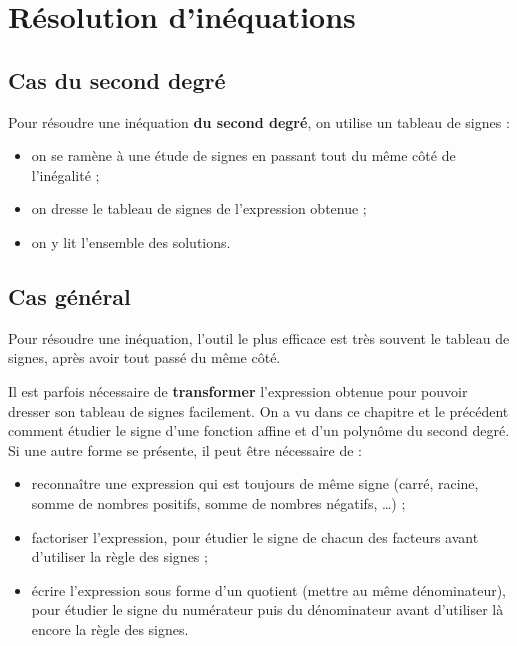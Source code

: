 \documentclass[a4paper,11pt]{article}
\begin{document}
\section{Résolution d'inéquations}

\subsection{Cas du second degré}

\begin{cmethode}
Pour résoudre une inéquation \textbf{du second degré}, on utilise un tableau de signes :
\begin{itemize}
	\item on se ramène à une étude de signes en passant tout du même côté de l'inégalité ;
	\item on dresse le tableau de signes de l'expression obtenue ;
	\item on y lit l'ensemble des solutions.
\end{itemize}
\end{cmethode}

\subsection{Cas général}

\begin{cmethode}
Pour résoudre une inéquation, l'outil le plus efficace est très souvent le tableau de signes, après avoir tout passé du même côté.

\smallskip

Il est parfois nécessaire de \textbf{transformer} l'expression obtenue pour pouvoir dresser son tableau de signes facilement. On a vu dans ce chapitre et le précédent comment étudier le signe d'une fonction affine et d'un polynôme du second degré. Si une autre forme se présente, il peut être nécessaire de :
\begin{itemize}
	\item reconnaître une expression qui est toujours de même signe (carré, racine, somme de nombres positifs, somme de nombres négatifs, \ldots) ;
	\item factoriser l'expression, pour étudier le signe de chacun des facteurs avant d'utiliser la règle des signes ;
	\item écrire l'expression sous forme d'un quotient (mettre au même dénominateur), pour étudier le signe du numérateur puis du dénominateur avant d'utiliser là encore la règle des signes.
\end{itemize}
\end{cmethode}
\end{document}
